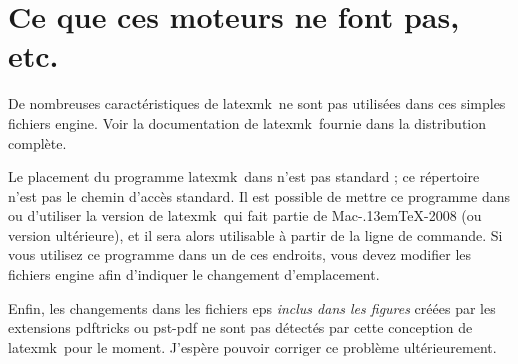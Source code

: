 \documentclass[11pt,french]{article}
\newcommand{\MacTeX}{Mac\kern-.13em\TeX}
\newcommand{\TS}{\textsf{\TeX Shop}}
\newcommand{\latexmk}{\textsf{latexmk}}
\newcommand{\cmd}[1]{\textsf{#1}}
\begin{document}
\section{Ce que ces moteurs ne font pas, etc.}

De nombreuses caractéristiques de \latexmk\ ne sont pas utilisées dans ces simples fichiers \cmd{engine}. Voir la documentation de \latexmk\ fournie dans la distribution complète.

Le placement du programme \latexmk\ dans  n'est pas standard ; ce répertoire n'est pas le chemin d'accès standard. Il est possible de mettre ce programme dans  ou d'utiliser la version de \latexmk\ qui fait partie de \MacTeX-2008 (ou version ultérieure), et il sera alors utilisable à partir de la ligne de commande. Si vous utilisez ce programme dans un de ces endroits, vous devez modifier les fichiers \cmd{engine} afin d'indiquer le changement d'emplacement.


Enfin, les changements dans les fichiers \cmd{eps} \emph{inclus dans les figures} créées par les extensions \cmd{pdftricks} ou \cmd{pst-pdf} ne sont pas détectés par cette conception de \latexmk\ pour le moment. J'espère pouvoir corriger ce problème ultérieurement.

%

%
\end{document}
